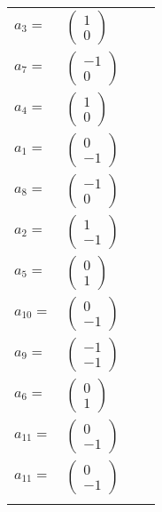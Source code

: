 \documentclass[1p]{elsarticle_modified}
\theoremstyle{definition}
\begin{document}
\begin{tabular}{m{7pt} m{180pt} m{7pt} m{180pt} }
\flushright $a_{3}=$&$\begin{pmatrix}1\\0\end{pmatrix}$ \\
\flushright $a_{7}=$&$\begin{pmatrix}-1\\0\end{pmatrix}$ \\
\flushright $a_{4}=$&$\begin{pmatrix}1\\0\end{pmatrix}$ \\
\flushright $a_{1}=$&$\begin{pmatrix}0\\-1\end{pmatrix}$ \\
\flushright $a_{8}=$&$\begin{pmatrix}-1\\0\end{pmatrix}$ \\
\flushright $a_{2}=$&$\begin{pmatrix}1\\-1\end{pmatrix}$ \\
\flushright $a_{5}=$&$\begin{pmatrix}0\\1\end{pmatrix}$ \\
\flushright $a_{10}=$&$\begin{pmatrix}0\\-1\end{pmatrix}$ \\
\flushright $a_{9}=$&$\begin{pmatrix}-1\\-1\end{pmatrix}$ \\
\flushright $a_{6}=$&$\begin{pmatrix}0\\1\end{pmatrix}$ \\
\flushright $a_{11}=$&$\begin{pmatrix}0\\-1\end{pmatrix}$\\ \flushright $a_{11}=$&$\begin{pmatrix}0\\-1\end{pmatrix}$\\&\end{tabular}
\end{document}
